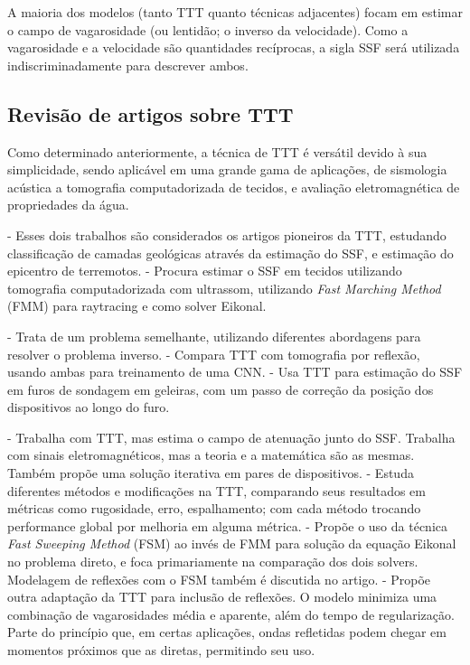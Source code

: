 A maioria dos modelos (tanto TTT quanto técnicas adjacentes) focam em estimar o campo de vagarosidade (ou lentidão; o inverso da velocidade). Como a vagarosidade e a velocidade são quantidades recíprocas, a sigla SSF será utilizada indiscriminadamente para descrever ambos.

\subsection{Revisão de artigos sobre TTT}
\label{sec_ttt:subsec_revisao}
Como determinado anteriormente, a técnica de TTT é versátil devido à sua simplicidade, sendo aplicável em uma grande gama de aplicações, de sismologia acústica a tomografia computadorizada de tecidos, e avaliação eletromagnética de propriedades da água. 

\begin{itemize}
	 - Esses dois trabalhos são considerados os artigos pioneiros da TTT, estudando classificação de camadas geológicas através da estimação do SSF, e estimação do epicentro de terremotos.
	 - Procura estimar o SSF em tecidos utilizando tomografia computadorizada com ultrassom, utilizando \textit{Fast Marching Method} (FMM) para raytracing e como solver Eikonal.
	\begin{itemize}
		 - Trata de um problema semelhante, utilizando diferentes abordagens para resolver o problema inverso.
		 - Compara TTT com tomografia por reflexão, usando ambas para treinamento de uma CNN.
		 - Usa TTT para estimação do SSF em furos de sondagem em geleiras, com um passo de correção da posição dos dispositivos ao longo do furo.
	\end{itemize}
	 - Trabalha com TTT, mas estima o campo de atenuação junto do SSF. Trabalha com sinais eletromagnéticos, mas a teoria e a matemática são as mesmas. Também propõe uma solução iterativa em pares de dispositivos.
	 - Estuda diferentes métodos e modificações na TTT, comparando seus resultados em métricas como rugosidade, erro, espalhamento; com cada método trocando performance global por melhoria em alguma métrica.
	 - Propõe o uso da técnica \textit{Fast Sweeping Method} (FSM) ao invés de FMM para solução da equação Eikonal no problema direto, e foca primariamente na comparação dos dois solvers. Modelagem de reflexões com o FSM também é discutida no artigo.
	 - Propõe outra adaptação da TTT para inclusão de reflexões. O modelo minimiza uma combinação de vagarosidades média e aparente, além do tempo de regularização. Parte do princípio que, em certas aplicações, ondas refletidas podem chegar em momentos próximos que as diretas, permitindo seu uso.
\end{itemize}

